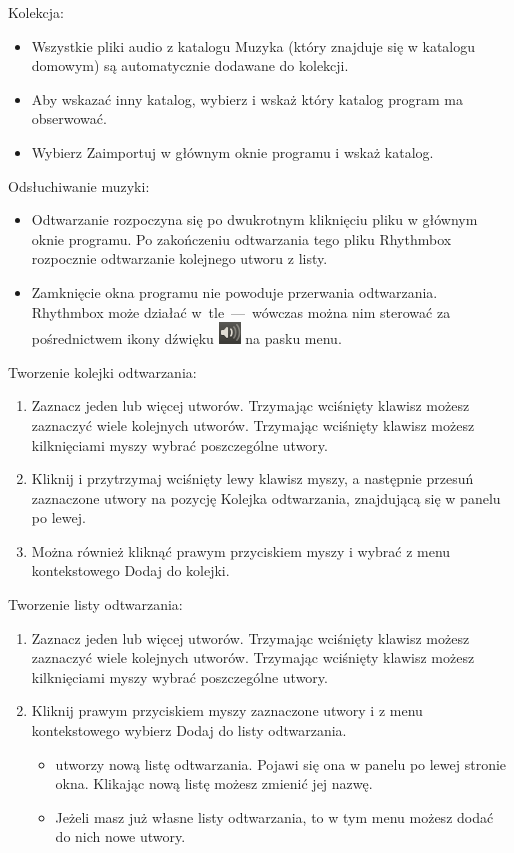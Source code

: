Kolekcja:
\begin{itemize}
\item Wszystkie pliki audio z katalogu Muzyka (który znajduje się w katalogu domowym) są automatycznie dodawane do kolekcji.
\item Aby wskazać inny katalog, wybierz  i wskaż który katalog program ma obserwować.
\item Wybierz \textcolor{ubuntu_orange}{Zaimportuj} w głównym oknie programu i wskaż katalog.
\end{itemize}
Odsłuchiwanie muzyki:
\begin{itemize}
\item Odtwarzanie rozpoczyna się po dwukrotnym kliknięciu pliku w głównym oknie programu. Po zakończeniu odtwarzania tego pliku Rhythmbox rozpocznie odtwarzanie kolejnego utworu z listy.
\item Zamknięcie okna programu nie powoduje przerwania odtwarzania. Rhythmbox może działać w~tle~---~wówczas można nim sterować za pośrednictwem ikony dźwięku \includegraphics{images/ikony_dzwiek.png} na pasku menu.
\end{itemize}
Tworzenie kolejki odtwarzania:
\begin{enumerate}
\item Zaznacz jeden lub więcej utworów. Trzymając wciśnięty klawisz  możesz zaznaczyć wiele kolejnych utworów. Trzymając wciśnięty klawisz  możesz kilknięciami myszy wybrać poszczególne utwory.
\item Kliknij i przytrzymaj wciśnięty lewy klawisz myszy, a następnie przesuń zaznaczone utwory na pozycję \textcolor{ubuntu_orange}{Kolejka odtwarzania}, znajdującą się w panelu po lewej.
\item Można również kliknąć prawym przyciskiem myszy i wybrać z menu kontekstowego \textcolor{ubuntu_orange}{Dodaj do kolejki}.
\end{enumerate}
Tworzenie listy odtwarzania:
\begin{enumerate}
\item Zaznacz jeden lub więcej utworów. Trzymając wciśnięty klawisz  możesz zaznaczyć wiele kolejnych utworów. Trzymając wciśnięty klawisz  możesz kilknięciami myszy wybrać poszczególne utwory.
\item  Kliknij prawym przyciskiem myszy zaznaczone utwory i z menu kontekstowego wybierz \textcolor{ubuntu_orange}{Dodaj do listy odtwarzania}.
\begin{itemize}
\item {} utworzy nową listę odtwarzania. Pojawi się ona w panelu po lewej stronie okna. Klikając nową listę możesz zmienić jej nazwę.
\item Jeżeli masz już własne listy odtwarzania, to w tym menu możesz dodać do nich nowe utwory.
\end{itemize}
\end{enumerate}
